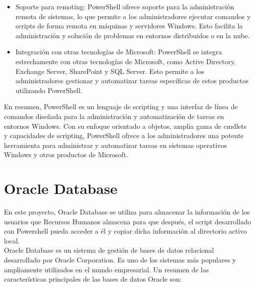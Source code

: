 \documentclass[a4paper, 12pt]{book}
\begin{document}
\begin{itemize}
\item Soporte para remoting: PowerShell ofrece soporte para la administración remota de sistemas, lo que permite a los administradores ejecutar comandos y scripts de forma remota en máquinas y servidores Windows. Esto facilita la administración y solución de problemas en entornos distribuidos o en la nube.

\item Integración con otras tecnologías de Microsoft: PowerShell se integra estrechamente con otras tecnologías de Microsoft, como Active Directory, Exchange Server, SharePoint y SQL Server. Esto permite a los administradores gestionar y automatizar tareas específicas de estos productos utilizando PowerShell.
\end{itemize}

En resumen, PowerShell es un lenguaje de scripting y una interfaz de línea de comandos diseñada para la administración y automatización de tareas en entornos Windows. Con su enfoque orientado a objetos, amplia gama de cmdlets y capacidades de scripting, PowerShell ofrece a los administradores una potente herramienta para administrar y automatizar tareas en sistemas operativos Windows y otros productos de Microsoft.



\section{Oracle Database} 
\label{sec:Oracle Database}

En este proyecto, Oracle Database se utiliza para almacenar la información de los usuarios que Recursos Humanos almacena para que después, el script desarrollado con Powershell pueda acceder a él y copiar dicha información al directorio activo local.
\\

Oracle Database es un sistema de gestión de bases de datos relacional desarrollado por Oracle Corporation. Es uno de los sistemas más populares y ampliamente utilizados en el mundo empresarial. Un resumen de las características principales de las bases de datos Oracle son:
\end{document}
